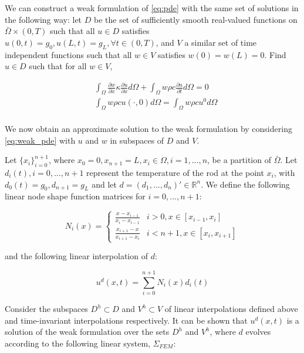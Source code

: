 \documentclass[oribibl]{llncs/llncs}
\newcommand*{\R}{\mathbb{R}}
\begin{document}
We can construct a weak formulation of \cref{eq:pde} with the same set of
solutions in the following way: let $D$ be the set of sufficiently smooth 
real-valued functions on $\bar{\Omega} \times (0, T)$ such that all 
$u \in D$ satisfies $u(0, t) = g_0, u(L, t) = g_L, \forall t \in (0, T)$, 
and $V$ a similar set of time
independent functions such that all $w \in V$ satisfies $w(0) = w(L) = 0$. 
Find $u \in D$ such that for all $w \in V$,

\begin{equation}\label{eq:weak_pde}
    \begin{aligned}
        &\int_{\Omega} \frac{\partial w}{\partial x} \kappa \frac{\partial
        u}{\partial x} d \Omega + 
        \int_{\Omega} w \rho c \frac{\partial u}{\partial t} d \Omega = 0 \\
        &\int_{\Omega} w \rho c u(\cdot, 0) d \Omega =
        \int_{\Omega} w \rho c u^0 d \Omega \\
    \end{aligned}
\end{equation}

We now obtain an approximate solution to the weak formulation by considering
\cref{eq:weak_pde} with $u$ and $w$ in subspaces of $D$ and $V$.

Let $\{x_i\}_{i = 0}^{n +
1}$, where $x_0 = 0, x_{n+1} = L, x_i \in \Omega, i = 1,...,n$, be a partition of
$\bar\Omega$. Let $d_i(t), i = 0,...,n+1$ represent the
temperature of the rod at the point $x_i$, with $d_0(t) = g_0, d_{n+1} = g_L$ and let $d = (d_1, ..., d_n)' \in
\R^n$. We define the following linear node shape function matrices for $i =
0,...,n+1$:

\begin{equation}
    N_i(x) = \begin{cases}
        \frac{x - x_{i - 1}}{x_i - x_{i - 1}} & i > 0, x \in [x_{i-1}, x_i] \\
        \frac{x_{i+1} - x}{x_{i+1} - x_{i}} & i < n+1, x \in [x_{i}, x_{i+1}] 
    \end{cases} 
\end{equation}

and the following linear interpolation of $d$:

\begin{equation}
    u^d(x, t) = \sum_{i=0}^{n+1} N_i(x) d_i(t)
\end{equation}

Consider the subspaces $D^h \subset D$ and $V^h \subset V$ of linear
interpolations defined above and time-invariant interpolations respectively.
It can be shown that $u^d(x, t)$ is a solution of the weak formulation over the
sets $D^h$ and $V^h$, where $d$ evolves
according to the following linear system, $\Sigma_{FEM}$:
\end{document}
